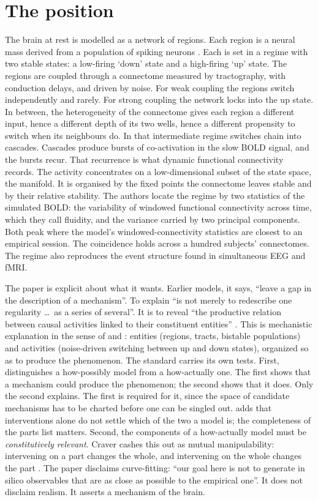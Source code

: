 \documentclass[11pt]{article}
\theoremstyle{definition}\newtheorem{observation}{Observation}
\theoremstyle{remark}\newtheorem{remark}{Remark}
\begin{document}
\section{The position}
The brain at rest is modelled as a network of regions. Each region is a neural mass derived from a population of spiking neurons \parencite{montbrio2015}. Each is set in a regime with two stable states: a low-firing `down' state and a high-firing `up' state. The regions are coupled through a connectome measured by tractography, with conduction delays, and driven by noise. For weak coupling the regions switch independently and rarely. For strong coupling the network locks into the up state. In between, the heterogeneity of the connectome gives each region a different input, hence a different depth of its two wells, hence a different propensity to switch when its neighbours do. In that intermediate regime switches chain into cascades. Cascades produce bursts of co-activation in the slow BOLD signal, and the bursts recur. That recurrence is what dynamic functional connectivity records. The activity concentrates on a low-dimensional subset of the state space, the manifold. It is organised by the fixed points the connectome leaves stable and by their relative stability. The authors locate the regime by two statistics of the simulated BOLD: the variability of windowed functional connectivity across time, which they call fluidity, and the variance carried by two principal components. Both peak where the model's windowed-connectivity statistics are closest to an empirical session. The coincidence holds across a hundred subjects' connectomes. The regime also reproduces the event structure found in simultaneous EEG and fMRI.

The paper is explicit about what it wants. Earlier models, it says, ``leave a gap in the description of a mechanism''. To explain ``is not merely to redescribe one regularity \ldots\ as a series of several''. It is to reveal ``the productive relation between causal activities linked to their constituent entities'' \parencite[Introduction]{fousek2024}. This is mechanistic explanation in the sense of \textcite{mdc2000} and \textcite{craver2007}: entities (regions, tracts, bistable populations) and activities (noise-driven switching between up and down states), organized so as to produce the phenomenon. The standard carries its own tests. First, \textcite{craver2006} distinguishes a how-possibly model from a how-actually one. The first shows that a mechanism could produce the phenomenon; the second shows that it does. Only the second explains. The first is required for it, since the space of candidate mechanisms has to be charted before one can be singled out. \textcite{baetu2015} adds that interventions alone do not settle which of the two a model is; the completeness of the parts list matters. Second, the components of a how-actually model must be \emph{constitutively relevant}. Craver cashes this out as mutual manipulability: intervening on a part changes the whole, and intervening on the whole changes the part \parencite{craver2007}. The paper disclaims curve-fitting: ``our goal here is not to generate in silico observables that are as close as possible to the empirical one''. It does not disclaim realism. It asserts a mechanism of the brain.
\end{document}
